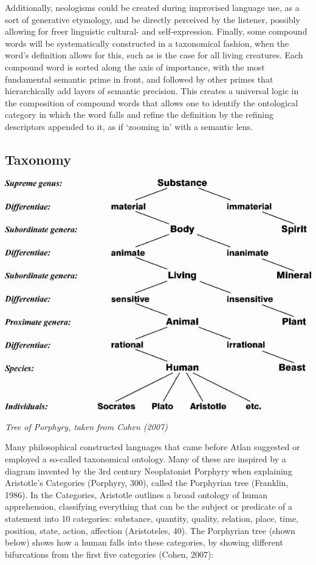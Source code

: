 Additionally, neologisms could be created during improvised language use, as a sort of generative etymology, and be directly perceived by the listener, possibly allowing for freer linguistic cultural- and self-expression. Finally, some compound words will be systematically constructed in a taxonomical fashion, when the word’s definition allows for this, such as is the case for all living creatures. Each compound word is sorted along the axis of importance, with the most fundamental semantic prime in front, and followed by other primes that hierarchically add layers of semantic precision. This creates a universal logic in the composition of compound words that allows one to identify the ontological category in which the word falls and refine the definition by the refining descriptors appended to it, as if ‘zooming in’ with a semantic lens.


\subsection{Taxonomy}

\vspace{0.3cm}
\begin{cent\idx{scent}er}
\includegraphics[scale=0.5]{./Images/tree.jpeg}

{\footnotesize \it Tree of Porphyry, taken from Cohen (2007)}
\end{cent\idx{scent}er}

\noindent Many philosophical constructed languages that came before Atlan suggested or employed a so-called taxonomical ontology. Many of these are inspired by a diagram invented by the 3rd century Neoplatonist Porphyry when explaining Aristotle’s Categories (Porphyry, 300), called the Porphyrian tree (Franklin, 1986). In the Categories, Aristotle outlines a broad ontology of human apprehension, classifying everything that can be the subject or predicate of a statement into 10 categories: substance, quantity, quality, relation, place, time, position, state, action, affection (Aristoteles, 40). The Porphyrian tree (shown below) shows how a human falls into these categories, by showing different bifurcations from the first five categories (Cohen, 2007): 

